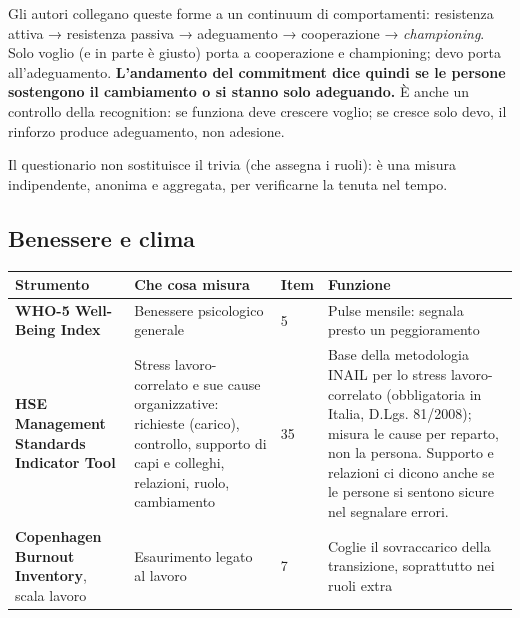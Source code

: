 \documentclass[11pt,a4paper]{article}
\begin{document}
Gli autori collegano queste forme a un continuum di comportamenti: resistenza attiva → resistenza passiva → adeguamento → cooperazione → \emph{championing}. Solo \guillemotleft{}voglio\guillemotright{} (e in parte \guillemotleft{}è giusto\guillemotright{}) porta a cooperazione e championing; \guillemotleft{}devo\guillemotright{} porta all'adeguamento. \textbf{L'andamento del commitment dice quindi se le persone sostengono il cambiamento o si stanno solo adeguando.} È anche un controllo della recognition: se funziona deve crescere \guillemotleft{}voglio\guillemotright{}; se cresce solo \guillemotleft{}devo\guillemotright{}, il rinforzo produce adeguamento, non adesione.

Il questionario non sostituisce il trivia (che assegna i ruoli): è una misura indipendente, anonima e aggregata, per verificarne la tenuta nel tempo.

\subsection{Benessere e clima}\label{sec:16.3}

{\small\renewcommand{\arraystretch}{1.25}
\begin{xltabular}{\linewidth}{@{}>{\raggedright\arraybackslash{}\hsize\hspace{0pt}}X>{\raggedright\arraybackslash{}\hsize\hspace{0pt}}X>{\raggedright\arraybackslash{}\hsize\hspace{0pt}}X>{\raggedright\arraybackslash{}\hsize\hspace{0pt}}X@{}}
\toprule
\textbf{Strumento} & \textbf{Che cosa misura} & \textbf{Item} & \textbf{Funzione} \\
\midrule
\endhead
\textbf{WHO-5 Well-Being Index} & Benessere psicologico generale & 5 & Pulse mensile: segnala presto un peggioramento \\
\textbf{HSE Management Standards Indicator Tool} & Stress lavoro-correlato e sue cause organizzative: richieste (carico), controllo, supporto di capi e colleghi, relazioni, ruolo, cambiamento & 35 & Base della metodologia INAIL per lo stress lavoro-correlato (obbligatoria in Italia, D.Lgs. 81/2008); misura le cause per reparto, non la persona. Supporto e relazioni ci dicono anche se le persone si sentono sicure nel segnalare errori. \\
\textbf{Copenhagen Burnout Inventory}, scala lavoro & Esaurimento legato al lavoro & 7 & Coglie il sovraccarico della transizione, soprattutto nei ruoli extra \\
\bottomrule
\end{xltabular}}
\end{document}
